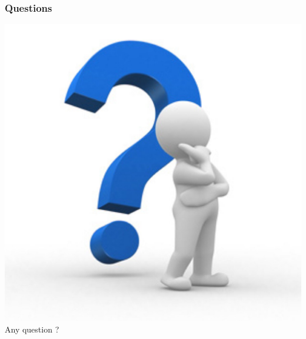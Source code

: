 \documentclass{beamer}
\begin{document}
\begin{frame}
  \frametitle{Questions}
  \begin{center}
  \includegraphics[keepaspectratio=true,width=.45\paperwidth]{fig/question-2.png}\\
  Any question ?
  \end{center}
\end{frame}
\end{document}
